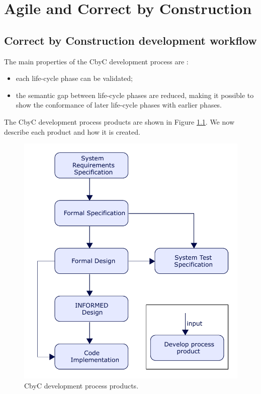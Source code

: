 
\chapter{Agile and Correct by Construction} %

\label{Chapter 2} %

\section{Correct by Construction development workflow}

The main properties of the CbyC development process are  \parencite{Tokeneer}:
\begin{itemize}
	\item each life-cycle phase can be validated;
	\item the semantic gap between life-cycle phases are reduced, making it possible
		to show the conformance of later life-cycle phases with earlier phases.
\end{itemize}

The CbyC development process products are shown in Figure \ref{fig:CbyCDev}. We now describe each product and how it is created.

\begin{figure}[H]
	\centering
	\includegraphics[scale=0.75]{Figures/CbyC_process.pdf}
	\decoRule
	\caption{CbyC development process products.}
	\label{fig:CbyCDev}
\end{figure}

